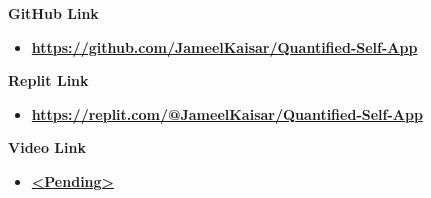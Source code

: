 \documentclass{article}
\begin{document}
\vspace{1cm}
{\huge \textbf{GitHub Link}}\\
\begin{itemize}
    \item \textbf{\url{https://github.com/JameelKaisar/Quantified-Self-App}}
\end{itemize}

\vspace{1cm}
{\huge \textbf{Replit Link}}\\
\begin{itemize}
    \item \textbf{\url{https://replit.com/@JameelKaisar/Quantified-Self-App}}
\end{itemize}

\vspace{1cm}
{\huge \textbf{Video Link}}\\
\begin{itemize}
    \item \textbf{\url{<Pending>}}
\end{itemize}
\end{document}
